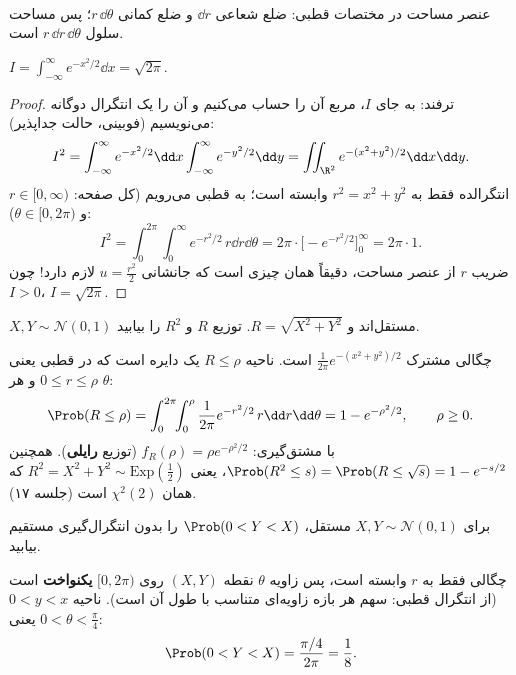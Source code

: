 \begin{center}
\begin{tikzpicture}
\end{tikzpicture}\\
{\small عنصر مساحت در مختصات قطبی: ضلع شعاعی $\dd r$ و ضلع کمانی $r\,\dd\theta$؛ پس مساحت سلول $r\,\dd r\,\dd\theta$ است.}
\end{center}

\begin{theorem}
$I=\int_{-\infty}^{\infty}e^{-x^2/2}\dd x=\sqrt{2\pi}$.
\end{theorem}
\begin{proof}
ترفند: به جای $I$، مربع آن را حساب می‌کنیم و آن را یک انتگرال دوگانه می‌نویسیم (فوبینی، حالت جداپذیر):
\[
I^2=\int_{-\infty}^{\infty}e^{-x^2/2}\dd x\int_{-\infty}^{\infty}e^{-y^2/2}\dd y=\iint_{\R^2}e^{-(x^2+y^2)/2}\dd x\dd y .
\]
انتگرالده فقط به $r^2=x^2+y^2$ وابسته است؛ به قطبی می‌رویم (کل صفحه: $r\in[0,\infty)$ و $\theta\in[0,2\pi)$):
\[
I^2=\int_0^{2\pi}\!\!\int_0^\infty e^{-r^2/2}\,r\dd r\dd\theta=2\pi\cdot\Big[-e^{-r^2/2}\Big]_0^\infty=2\pi\cdot1 .
\]
ضریب $r$ از عنصر مساحت، دقیقاً همان چیزی است که جانشانی $u=\frac{r^2}{2}$ لازم دارد! چون $I>0$، $I=\sqrt{2\pi}$.
\end{proof}

\begin{example}
$X,Y\sim\mathcal N(0,1)$ مستقل‌اند و $R=\sqrt{X^2+Y^2}$. توزیع $R$ و $R^2$ را بیابید.
\begin{solution}
چگالی مشترک $\frac{1}{2\pi}e^{-(x^2+y^2)/2}$ است. ناحیه $R\le\rho$ یک دایره است که در قطبی یعنی $0\le r\le\rho$ و هر $\theta$:
\[
\Prob(R\le\rho)=\int_0^{2\pi}\!\!\int_0^\rho\frac{1}{2\pi}e^{-r^2/2}\,r\dd r\dd\theta=1-e^{-\rho^2/2},\qquad\rho\ge0 .
\]
با مشتق‌گیری: $f_R(\rho)=\rho e^{-\rho^2/2}$ (توزیع \textbf{رایلی}). همچنین $\Prob(R^2\le s)=\Prob(R\le\sqrt s)=1-e^{-s/2}$، یعنی $R^2=X^2+Y^2\sim\mathrm{Exp}(\frac12)$ که همان $\chi^2(2)$ است (جلسه ۱۷).
\end{solution}
\end{example}

\begin{example}
برای $X,Y\sim\mathcal N(0,1)$ مستقل، $\Prob(0<Y<X)$ را بدون انتگرال‌گیری مستقیم بیابید.
\begin{solution}
چگالی فقط به $r$ وابسته است، پس زاویه $\theta$ نقطه $(X,Y)$ روی $[0,2\pi)$ \textbf{یکنواخت} است (از انتگرال قطبی: سهم هر بازه زاویه‌ای متناسب با طول آن است). ناحیه $0<y<x$ یعنی $0<\theta<\frac\pi4$:
\[
\Prob(0<Y<X)=\frac{\pi/4}{2\pi}=\frac18 .
\]
\end{solution}
\end{example}


